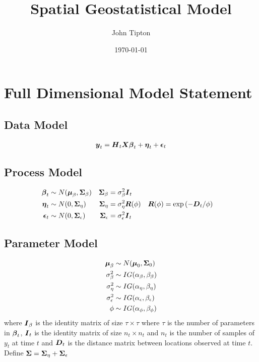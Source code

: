 \documentclass[fleqn]{article}
\title{Spatial Geostatistical Model}
\author{John Tipton}
\date{\today}
\def\bm#1{\mbox{\boldmath $#1$}}
\begin{document}
\maketitle

\section{Full Dimensional Model Statement}
%
\subsection{Data Model}
\begin{align*}
\bm{y}_t & = \bm{H}_t \bm{X} \bm{\beta}_t + \bm{\eta}_t + \bm{\epsilon}_t\\
%
\end{align*}
%
\subsection{Process Model}
%
\begin{align*}
%
\bm{\beta}_t & \sim N(\bm{\mu}_\beta, \bm{\Sigma}_\beta) & \bm{\Sigma}_\beta &  = \sigma^2_\beta \bm{I}_t\\
%
\bm{\eta}_t & \sim N(0, \bm{\Sigma}_\eta) & \bm{\Sigma}_\eta &  = \sigma^2_\eta \bm{R}(\phi) & \bm{R}(\phi) & = \exp{( - \bm{D}_t / \phi)}\\
%
\bm{\epsilon}_t & \sim N(0, \bm{\Sigma}_\epsilon) & \bm{\Sigma}_\epsilon &  = \sigma^2_\epsilon \bm{I}_t\\
%
\end{align*}
%
\subsection{Parameter Model}
%
\begin{align*}
%
\bm{\mu}_\beta & \sim N(\bm{\mu}_0, \bm{\Sigma}_0)\\
%
\sigma^2_\beta & \sim IG(\alpha_\beta, \beta_\beta)\\
%
\sigma^2_\eta & \sim IG(\alpha_\eta, \beta_\eta)\\
%
\sigma^2_\epsilon & \sim IG(\alpha_\epsilon, \beta_\epsilon)\\
%
\phi & \sim IG(\alpha_\phi, \beta_\phi)
\end{align*}
%
where $\bm{I}_\beta$ is the identity matrix of size $\tau \times \tau$ where $\tau$ is the number of parameters in $\bm{\beta}_t$, $\bm{I}_t$ is the identity matrix of size $n_t \times n_t$ and $n_t$ is the number of samples of $y_t$ at time $t$ and $\bm{D}_t$ is the distance matrix between locations observed at time $t$. Define $\bm{\Sigma} = \bm{\Sigma}_\eta + \bm{\Sigma}_\epsilon$
%
\end{document}
